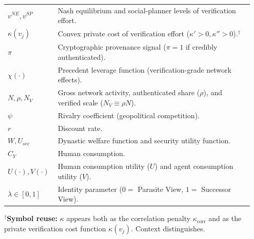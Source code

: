 \documentclass[12pt, letter]{article}
\begin{document}
\begin{longtable}{p{0.18\linewidth} p{0.77\linewidth}}
$v^{NE}, v^{SP}$ & Nash equilibrium and social-planner levels of verification effort. \\
$\kappa(v_j)$ & Convex private cost of verification effort ($\kappa'>0,\kappa''>0$).$^\dagger$ \\
$\pi$ & Cryptographic provenance signal ($\pi = 1$ if credibly authenticated). \\
$\chi(\cdot)$ & Precedent leverage function (verification-grade network effects). \\
$N, \rho, N_V$ & Gross network activity, authenticated share ($\rho$), and verified scale ($N_V \equiv \rho N$). \\
$\psi$ & Rivalry coefficient (geopolitical competition). \\
$r$ & Discount rate. \\
$W, U_{sec}$ & Dynastic welfare function and security utility function. \\
$C_Y$ & Human consumption. \\
$U(\cdot), V(\cdot)$ & Human consumption utility ($U$) and agent consumption utility ($V$). \\
$\lambda \in [0,1]$ & Identity parameter ($0 =$ Parasite View, $1 =$ Successor View). \\

\end{longtable}
\renewcommand{\arraystretch}{1.0}

\vspace{0.5em}
\noindent\small{$^\dagger$\textbf{Symbol reuse:} $\kappa$ appears both as the correlation penalty $\kappa_{\mathrm{corr}}$ and as the private verification cost function $\kappa(v_j)$. Context distinguishes.}



\clearpage

\newpage


 

\end{document}
